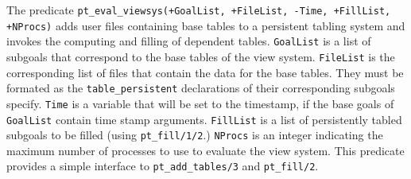 \begin{description}
%
The predicate {\tt pt\_eval\_viewsys(+GoalList, +FileList, -Time,
  +FillList, +NProcs)} adds user files containing base tables to a
persistent tabling system and invokes the computing and filling of
dependent tables.  {\tt GoalList} is a list of subgoals that
correspond to the base tables of the view system. {\tt FileList} is
the corresponding list of files that contain the data for the base
tables.  They must be formated as the {\tt table\_persistent}
declarations of their corresponding subgoals specify.  {\tt Time} is a
variable that will be set to the timestamp, if the base goals of {\tt
  GoalList} contain time stamp arguments.  {\tt FillList} is a list of
persistently tabled subgoals to be filled (using {\tt pt\_fill/1/2}.)
{\tt NProcs} is an integer indicating the maximum number of processes
to use to evaluate the view system.  This predicate provides a simple
interface to {\tt pt\_add\_tables/3} and {\tt pt\_fill/2}.

\end{description}

